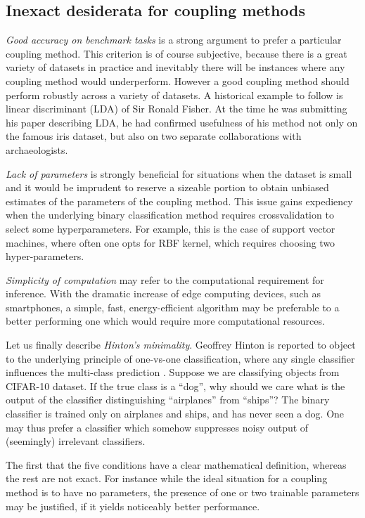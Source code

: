 \documentclass[twoside,11pt]{article}
\begin{document}
\subsection{Inexact desiderata for coupling methods}

\label{sec:des:inexact}

\emph{Good accuracy on benchmark tasks} is  a strong argument to prefer a particular coupling method. This criterion is of course subjective, because there is a great variety of datasets in practice and inevitably there will be instances where any coupling method would underperform. However a good coupling method should perform robustly across a variety of datasets. A historical  example to follow is linear discriminant (LDA) of  Sir Ronald Fisher. At the time he was submitting his paper describing LDA, he had confirmed usefulness of his method not only on the famous iris dataset, but also on two separate collaborations with archaeologists. 

\emph{Lack of parameters} is strongly beneficial for situations when the dataset is small and it would be imprudent to reserve a sizeable portion to obtain unbiased estimates of the parameters of the coupling method. This issue gains expediency when the underlying binary classification method requires crossvalidation to select some hyperparameters. For example, this is the case of support vector machines, where often one opts for RBF kernel, which requires choosing two hyper-parameters. 

\emph{Simplicity of computation}  may refer to the computational requirement for inference. With the dramatic increase of edge computing devices, such as smartphones, a simple, fast, energy-efficient algorithm may be preferable to a better performing one which would require more computational resources. 

Let us finally describe \emph{Hinton's minimality}. Geoffrey Hinton is reported to object to the underlying principle of one-vs-one classification, where any single classifier influences the multi-class prediction \cite[p.~467]{hastie1998classification}. Suppose we are classifying objects from CIFAR-10 dataset.  If the true class is  a ``dog'', why should we care what is the output of the classifier distinguishing ``airplanes'' from ``ships''? The binary classifier is trained only on airplanes and ships, and has never seen a dog. One may thus prefer a classifier which somehow suppresses noisy output of (seemingly) irrelevant classifiers.


The first that the five conditions have a clear mathematical definition, whereas the rest are not exact. For instance while the ideal situation for a coupling method is to have no parameters, the presence of one or two trainable parameters may be justified, if it yields noticeably better performance.
\end{document}
